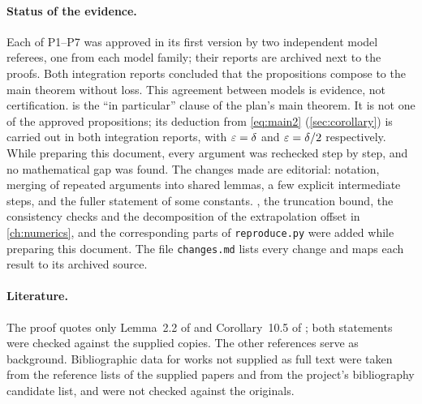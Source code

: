 \paragraph{Status of the evidence.} Each of P1--P7 was approved in its first version by two independent model referees, one from each model family; their reports are archived next to the proofs. Both integration reports concluded that the propositions compose to the main theorem without loss. This agreement between models is evidence, not certification.  is the ``in particular'' clause of the plan's main theorem. It is not one of the approved propositions; its deduction from \eqref{eq:main2} (\cref{sec:corollary}) is carried out in both integration reports, with $\varepsilon=\delta$ and $\varepsilon=\delta/2$ respectively. While preparing this document, every argument was rechecked step by step, and no mathematical gap was found. The changes made are editorial: notation, merging of repeated arguments into shared lemmas, a few explicit intermediate steps, and the fuller statement of some constants. , the truncation bound, the consistency checks and the decomposition of the extrapolation offset in \cref{ch:numerics}, and the corresponding parts of \texttt{reproduce.py} were added while preparing this document. The file \texttt{changes.md} lists every change and maps each result to its archived source.

\paragraph{Literature.} The proof quotes only Lemma~2.2 of \cite{bgpvw1998} and Corollary~10.5 of \cite{montgomeryvaughan2007}; both statements were checked against the supplied copies. The other references serve as background. Bibliographic data for works not supplied as full text were taken from the reference lists of the supplied papers and from the project's bibliography candidate list, and were not checked against the originals.
